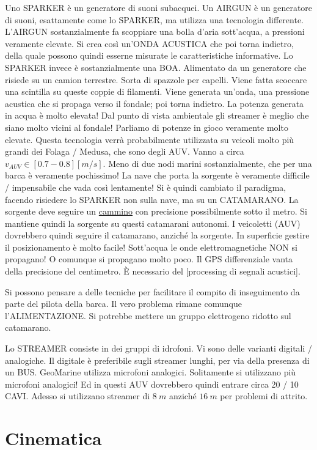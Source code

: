 Uno SPARKER è un generatore di suoni subacquei. Un AIRGUN è un generatore di suoni, esattamente come lo SPARKER, ma utilizza una tecnologia differente. L'AIRGUN sostanzialmente fa scoppiare una bolla d'aria sott'acqua, a pressioni veramente elevate. Si crea così un'ONDA ACUSTICA che poi torna indietro, della quale possono quindi esserne misurate le caratteristiche informative. Lo SPARKER invece è sostanzialmente una BOA. Alimentato da un generatore che risiede su un camion terrestre. Sorta di spazzole per capelli. Viene fatta scoccare una scintilla su queste coppie di filamenti. Viene generata un'onda, una pressione acustica che si propaga verso il fondale; poi torna indietro. La potenza generata in acqua è molto elevata! Dal punto di vista ambientale gli streamer è meglio che siano molto vicini al fondale! Parliamo di potenze in gioco veramente molto elevate.
Questa tecnologia verrà probabilmente utilizzata su veicoli molto più grandi dei Folaga / Medusa, che sono degli AUV. Vanno a circa $v_{AUV} \in [0.7-0.8][m/s]$. Meno di due nodi marini sostanzialmente, che per una barca è veramente pochissimo! La nave che porta la sorgente è veramente difficile / impensabile che vada così lentamente! Si è quindi cambiato il paradigma, facendo risiedere lo SPARKER non sulla nave, ma su un CATAMARANO. La sorgente deve seguire un \underline{cammino} con precisione possibilmente sotto il metro. Si mantiene quindi la sorgente su questi catamarani autonomi. I veicoletti (AUV) dovrebbero quindi seguire il catamarano, anziché la sorgente. In superficie gestire il posizionamento è molto facile! Sott'acqua le onde elettromagnetiche NON si propagano! O comunque si propagano molto poco. Il GPS differenziale vanta della precisione del centimetro. \`E necessario del [processing di segnali acustici].

Si possono pensare a delle tecniche per facilitare il compito di inseguimento da parte del pilota della barca. Il vero problema rimane comunque l'ALIMENTAZIONE. Si potrebbe mettere un gruppo elettrogeno ridotto sul catamarano.

Lo STREAMER consiste in dei gruppi di idrofoni. Vi sono delle varianti digitali / analogiche. Il digitale è preferibile sugli streamer lunghi, per via della presenza di un BUS. GeoMarine utilizza microfoni analogici. Solitamente si utilizzano più microfoni analogici! Ed in questi AUV dovrebbero quindi entrare circa 20 / 10 CAVI. Adesso si utilizzano streamer di $8\ m$ anziché $16\ m$ per problemi di attrito.

\section{Cinematica}

